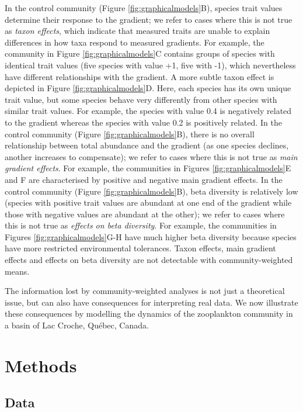 \documentclass[12pt]{ecology}
\begin{document}
In the control community (Figure \ref{fig:graphicalmodels}B), species trait values determine their response to the gradient; we refer to cases where this is not true as \emph{taxon effects}, which indicate that measured traits are unable to explain differences in how taxa respond to measured gradients.  For example, the community in Figure \ref{fig:graphicalmodels}C contains groups of species with identical trait values (five species with value +1, five with -1), which nevertheless have different relationships with the gradient.  A more subtle taxon effect is depicted in Figure \ref{fig:graphicalmodels}D.  Here, each species has its own unique trait value, but some species behave very differently from other species with similar trait values.  For example, the species with value 0.4 is negatively related to the gradient whereas the species with value 0.2 is positively related.  In the control community (Figure \ref{fig:graphicalmodels}B), there is no overall relationship between total abundance and the gradient (as one species declines, another increases to compensate); we refer to cases where this is not true as \emph{main gradient effects}.  For example, the communities in Figures \ref{fig:graphicalmodels}E and F are characterised by positive and negative main gradient effects.  In the control community (Figure \ref{fig:graphicalmodels}B), beta diversity is relatively low (species with positive trait values are abundant at one end of the gradient while those with negative values are abundant at the other); we refer to cases where this is not true as \emph{effects on beta diversity}.  For example, the communities in Figures \ref{fig:graphicalmodels}G-H have much higher beta diversity because species have more restricted environmental tolerances.  Taxon effects, main gradient effects and effects on beta diversity are not detectable with community-weighted means.

The information lost by community-weighted analyses is not just a theoretical issue, but can also have consequences for interpreting real data.  We now illustrate these consequences by modelling the dynamics of the zooplankton community in a basin of Lac Croche, Qu\'{e}bec, Canada.

\section{Methods}

\subsection{Data}
\end{document}
